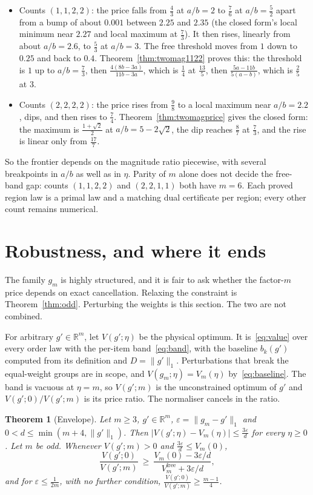 \documentclass[conference]{IEEEtran}
\newtheorem{theorem}{Theorem}
\theoremstyle{definition}
\begin{document}
\begin{itemize}
\item Counts $(1,1,2,2)$: the price falls from $\frac43$ at $a/b=2$ to $\frac76$ at $a/b=\frac52$
apart from a bump of about $0.001$ between $2.25$ and $2.35$ (the closed form's local minimum near
$2.27$ and local maximum at $\frac73$). It then rises,
linearly from about $a/b=2.6$, to $\frac53$ at $a/b=3$. The free threshold moves
from $1$ down to $0.25$ and back to $0.4$. Theorem~\ref{thm:twomag1122} proves this: the threshold
is $1$ up to $a/b=\frac73$, then $\frac{4(8b-3a)}{11b-3a}$, which is $\frac14$ at $\frac{13}5$, then
$\frac{5a-11b}{5(a-b)}$, which is $\frac25$ at $3$.
\item Counts $(2,2,2,2)$: the price rises from $\frac98$ to a local maximum near $a/b=2.2$,
dips, and then rises to $\frac74$. Theorem~\ref{thm:twomagprice} gives the closed form: the maximum
is $\frac{1+\sqrt2}2$ at $a/b=5-2\sqrt2$, the dip reaches $\frac87$ at $\frac73$, and the rise is
linear only from $\frac{17}7$.
\end{itemize}
So the frontier depends on the magnitude ratio piecewise, with several breakpoints in $a/b$ as
well as in $\eta$. Parity of $m$ alone does not decide the free-band gap: counts $(1,1,2,2)$ and
$(2,2,1,1)$ both have $m=6$. Each proved region law is a primal law and a matching dual
certificate per region; every other count remains numerical.

\section{Robustness, and where it ends}
\label{sec:robust}

The family $g_{m}$ is highly structured, and it is fair to ask whether the factor-$m$ price
depends on exact cancellation. Relaxing the constraint is Theorem~\ref{thm:odd}. Perturbing
the weights is this section. The two are not combined.

For arbitrary $g'\in\mathbb{R}^{m}$, let $V(g';\eta)$ be the physical optimum. It
is~\eqref{eq:value} over every order law with the per-item band~\eqref{eq:band}, with the
baseline $b_{k}(g')$ computed from its definition and $D=\|g'\|_{1}$. Perturbations that break
the equal-weight groups are in scope, and $V(g_{m};\eta)=V_{m}(\eta)$
by~\eqref{eq:baseline}. The band is vacuous at $\eta=m$, so $V(g';m)$ is the unconstrained
optimum of $g'$ and $V(g';0)/V(g';m)$ is its price ratio. The normaliser cancels in the
ratio.

\begin{theorem}[Envelope]
\label{thm:robust}
Let $m\ge3$, $g'\in\mathbb{R}^{m}$, $\varepsilon=\|g_{m}-g'\|_{1}$ and
$0<d\le\min(m+4,\|g'\|_{1})$. Then $|V(g';\eta)-V_{m}(\eta)|\le\frac{3\varepsilon}{d}$ for
every $\eta\ge0$. Let $m$ be odd. Whenever $V(g';m)>0$ and $\frac{3\varepsilon}{d}\le V_{m}(0)$,
\[
\frac{V(g';0)}{V(g';m)}\ \ge\ \frac{V_{m}(0)-3\varepsilon/d}{V^{\mathrm{free}}_{m}+3\varepsilon/d},
\]
and for $\varepsilon\le\frac{1}{2m}$, with no further condition,
$\frac{V(g';0)}{V(g';m)}\ge\frac{m-1}{4}$.
\end{theorem}
\end{document}
